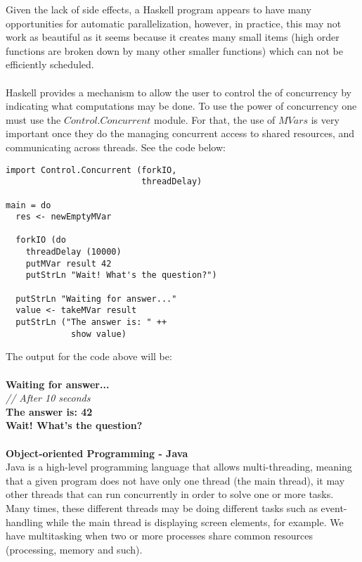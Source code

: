 \documentclass[conference]{IEEEtran}
\begin{document}
Given the lack of side effects, a Haskell program appears to have many opportunities for automatic
parallelization, however, in practice, this may not work as beautiful as it seems because it creates many small items (high order functions are broken down by many other smaller functions) which can not be efficiently scheduled.
\\\\
Haskell provides a mechanism to allow the user to control the of concurrency by indicating what computations may be done. To use the power of concurrency one must use the $Control.Concurrent$ module. For that, the use of $MVars$ is very important once they do the managing concurrent access to shared resources, and communicating across threads. See the code below:
\lstset{language=haskell}
\begin{lstlisting}[frame=single]
import Control.Concurrent (forkIO,
                           threadDelay)

main = do
  res <- newEmptyMVar

  forkIO (do
    threadDelay (10000)
    putMVar result 42
    putStrLn "Wait! What's the question?")

  putStrLn "Waiting for answer..."
  value <- takeMVar result
  putStrLn ("The answer is: " ++
             show value)
\end{lstlisting}

The output for the code above will be:
\\\\
\textbf{Waiting for answer...}\\
\textit{// After 10 seconds }\\
\textbf{The answer is: 42}\\
\textbf{Wait! What's the question?}\\\\

\textbf{ Object-oriented Programming - Java }\\
Java is a high-level programming language that allows multi-threading, meaning that a given program does not have only one thread (the main thread), it may other threads that can run concurrently in order to solve one or more tasks. Many times, these different threads may be doing different tasks such as event-handling while the main thread is displaying screen elements, for example. We have multitasking when two or more processes share common resources (processing, memory and such).\\\\
\end{document}
